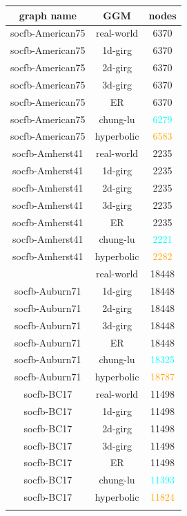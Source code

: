 \begin{table}[]
    \centering
    \begin{tabular}{|c|c|c|}
    \hline
    \textbf{graph name} & \textbf{GGM} & \textbf{nodes} \\ \hline
    socfb-American75 & real-world & 6370 \\ \hline
    socfb-American75 & 1d-girg & 6370 \\ \hline
    socfb-American75 & 2d-girg & 6370 \\ \hline
    socfb-American75 & 3d-girg & 6370 \\ \hline
    socfb-American75 & ER & 6370 \\ \hline
    socfb-American75 & chung-lu & \textcolor{cyan}{6279} \\ \hline
    socfb-American75 & hyperbolic & \textcolor{orange}{6583} \\ \hline
    
    socfb-Amherst41 & real-world & 2235 \\ \hline
    socfb-Amherst41 & 1d-girg & 2235 \\ \hline
    socfb-Amherst41 & 2d-girg & 2235 \\ \hline
    socfb-Amherst41 & 3d-girg & 2235 \\ \hline
    socfb-Amherst41 & ER & 2235 \\ \hline
    socfb-Amherst41 & chung-lu & \textcolor{cyan}{2221} \\ \hline
    socfb-Amherst41 & hyperbolic & \textcolor{orange}{2282} \\ \hline

\end{tabular}
\end{table}

